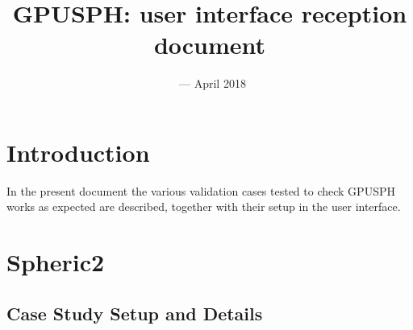 \documentclass{../GPUSPHtemplate}
\title{GPUSPH: user interface reception document}
\author{}
\date{\currentver\ --- April 2018}
\begin{document}
\maketitle
\tableofcontents
\clearpage
\section{Introduction}

In the present document the various validation cases tested to check GPUSPH works as expected
are described, together with their setup in the user interface.

\section{Spheric2}


\subsection{Case Study Setup and Details}
   
\end{document}

